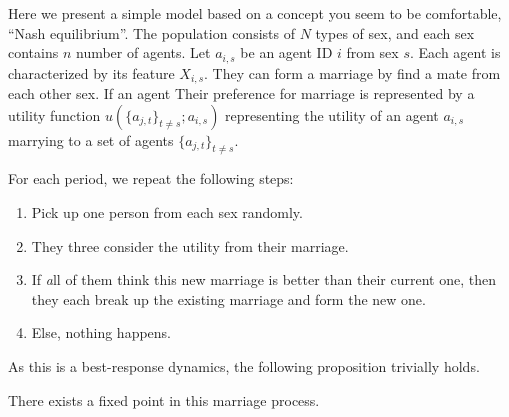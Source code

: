 


Here we present a simple model based on a concept you seem to be comfortable, ``Nash equilibrium''. The population consists of $N$ types of sex, and each sex contains $n$ number of agents. Let $a_{i,s}$ be an agent ID $i$ from sex $s$. Each agent is characterized by its feature $X_{i,s}$. They can form a marriage by find a mate from each other sex. If an agent Their preference for marriage is represented by a utility function $u(\{a_{j,t} \}_{t\neq s}  ;a_{i,s})$ representing the utility of an agent $a_{i,s}$ marrying to a set of agents $\{a_{j,t} \}_{t\neq s}$.

For each period, we repeat the following steps:
\begin{enumerate}
    \item Pick up one person from each sex randomly.
    \item They three consider the utility from their marriage.
    \item If {\textit all} of them think this new marriage is better than their current one, then they each break up the existing marriage and form the new one.
    \item Else, nothing happens.
\end{enumerate}
As this is a best-response dynamics, the following proposition trivially holds.
\begin{proposition}
There exists a fixed point in this marriage process.
\end{proposition}